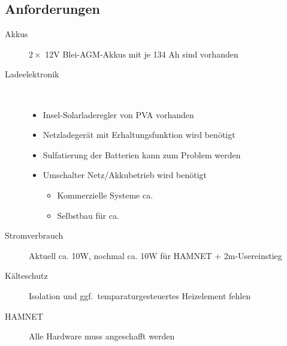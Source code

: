 \documentclass[a4paper]{scrartcl}
\begin{document}
\subsection{Anforderungen}
\begin{description}
    \item[Akkus] $2\times$ 12V Blei-AGM-Akkus mit je 134 Ah sind vorhanden
    \item[Ladeelektronik] ~
        \begin{itemize}
            \item Insel-Solarladeregler von PVA vorhanden
            \item Netzladeger\"at mit Erhaltungsfunktion wird ben\"otigt
            \item Sulfatierung der Batterien kann zum Problem werden
            \item Umschalter Netz/Akkubetrieb wird ben\"otigt
                \begin{itemize}
                    \item Kommerzielle Systeme ca. 
                    \item Selbstbau f\"ur ca. 
                \end{itemize}
        \end{itemize}
    \item[Stromverbrauch] Aktuell ca. 10W, nochmal ca. 10W f\"ur HAMNET + 2m-Usereinstieg
    \item[K\"alteschutz] Isolation und ggf.\ temparaturgesteuertes Heizelement fehlen
    \item[HAMNET] Alle Hardware muss angeschafft werden
\end{description}
\end{document}

